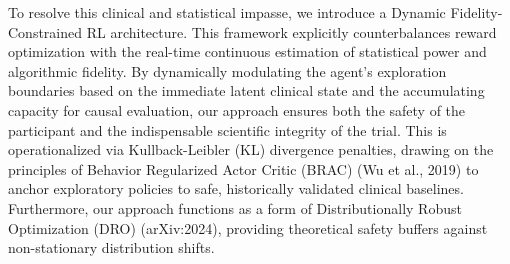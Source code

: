To resolve this clinical and statistical impasse, we introduce a Dynamic Fidelity-Constrained RL architecture. This framework explicitly counterbalances reward optimization with the real-time continuous estimation of statistical power and algorithmic fidelity. By dynamically modulating the agent's exploration boundaries based on the immediate latent clinical state and the accumulating capacity for causal evaluation, our approach ensures both the safety of the participant and the indispensable scientific integrity of the trial. This is operationalized via Kullback-Leibler (KL) divergence penalties, drawing on the principles of Behavior Regularized Actor Critic (BRAC) (Wu et al., 2019) to anchor exploratory policies to safe, historically validated clinical baselines. Furthermore, our approach functions as a form of Distributionally Robust Optimization (DRO) (arXiv:2024), providing theoretical safety buffers against non-stationary distribution shifts.
